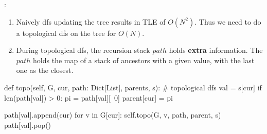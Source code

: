 :
\begin{enumerate}
\item Naively dfs updating the tree results in TLE of $O(N^2)$. Thus we need to do a topological dfs on the tree for $O(N)$.
\item During topological dfs, the recursion stack $path$ holds \textbf{extra} information. The $path$ holds the map of a stack of ancestors with a given value, with the last one as the closest. 
\end{enumerate}
\begin{python}
def topo(self, G, cur, path: Dict[List], parents, s):
    # topological dfs
    val = s[cur]
    if len(path[val]) > 0:
        pi = path[val][~0]
        parent[cur] = pi
    
    path[val].append(cur)
    for v in G[cur]:
        self.topo(G, v, path, parent, s)
    path[val].pop()
\end{python}

